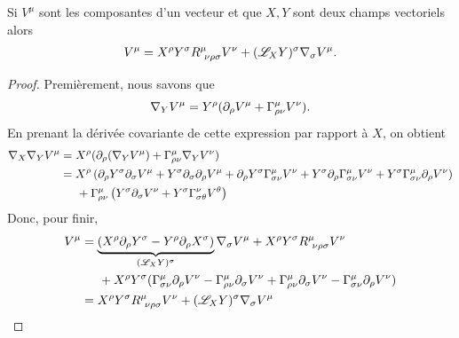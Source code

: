 \documentclass[a4paper,11pt]{report}
\begin{document}
            \begin{prop}\begin{leftbar}
                Si $V^\mu$ sont les composantes d'un vecteur et que $X,Y$ sont deux champs vectoriels alors
                \begin{align}
                    [\nabla_X,\nabla_Y]V^\mu = X^\rho Y^\sigma R^{\mu}_{~\nu\rho\sigma}V^\nu + (\L_X Y)^\sigma\nabla_\sigma V^\mu.
                \end{align}
            \end{leftbar}\end{prop}
            
            \begin{proof}
                Premièrement, nous savons que
                \begin{equation}
                    \nabla_Y V^\mu = Y^\rho(\partial_\rho V^\mu+\Gamma^\mu_{\rho\nu}V^\nu).
                \end{equation}
                En prenant la dérivée covariante de cette expression par rapport à $X$, on obtient
                \begin{align}
                    \nabla_X \nabla_Y V^\mu &= X^\rho(\partial_\rho (\nabla_Y V^\mu)+\Gamma^\mu_{\rho\nu}\nabla_Y V^\nu)\\
                    &= X^\rho \left( \partial_\rho Y^\sigma\partial_\sigma V^\mu+Y^\sigma\partial_\sigma\partial_\rho V^\mu + \partial_\rho Y^\sigma \Gamma^\mu_{\sigma\nu} V^\nu + Y^\sigma\partial_\rho\Gamma^\mu_{\sigma\nu} V^\nu +Y^\sigma \Gamma^\mu_{\sigma\nu}\partial_\rho V^\nu \right)\\
                    &\hspace{0.5cm}+\Gamma^\mu_{\rho\nu}\left( Y^\sigma\partial_\sigma V^\nu + Y^\sigma \Gamma^\nu_{\sigma\theta} V^\theta \right)
                \end{align}
                Donc, pour finir,
                \begin{align}
                    [\nabla_X,\nabla_Y]V^\mu &= \underbrace{(X^\rho\p_\rho Y^\sigma-Y^\rho\p_\rho X^\sigma)}_{(\L_XY)^\sigma}\nabla_\sigma V^\mu+ X^\rho Y^\sigma R^\mu_{~\nu\rho\sigma} V^\nu\\
                    &\hspace{0.5cm}+ X^\rho Y^\sigma (\Gamma^\mu_{\sigma\nu}\p_\rho V^\nu-\Gamma^\mu_{\rho\nu}\p_\sigma V^\nu + \Gamma^\mu_{\rho\nu}\p_\sigma V^\nu-\Gamma^\mu_{\sigma\nu}\p_\rho V^\nu )\\
                    &= X^\rho Y^\sigma R^{\mu}_{~\nu\rho\sigma}V^\nu + (\L_X Y)^\sigma\nabla_\sigma V^\mu
                \end{align}
            \end{proof}
            
\end{document}
